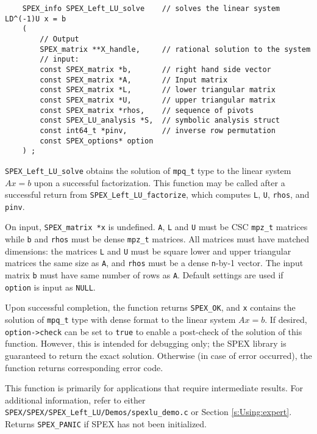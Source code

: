 \documentclass[12pt]{report}
\theoremstyle{definition}
\begin{document}
\begin{mdframed}[userdefinedwidth=6in]
{\footnotesize
\begin{verbatim}
    SPEX_info SPEX_Left_LU_solve    // solves the linear system LD^(-1)U x = b
    (
        // Output
        SPEX_matrix **X_handle,     // rational solution to the system
        // input:
        const SPEX_matrix *b,       // right hand side vector
        const SPEX_matrix *A,       // Input matrix
        const SPEX_matrix *L,       // lower triangular matrix
        const SPEX_matrix *U,       // upper triangular matrix
        const SPEX_matrix *rhos,    // sequence of pivots
        const SPEX_LU_analysis *S,  // symbolic analysis struct
        const int64_t *pinv,        // inverse row permutation
        const SPEX_options* option
    ) ;
\end{verbatim}
} \end{mdframed}

\verb|SPEX_Left_LU_solve| obtains the solution of \verb|mpq_t| type to the
linear system $Ax=b$ upon a successful factorization.  This function may be
called after a successful return from \verb|SPEX_Left_LU_factorize|, which
computes \verb|L|, \verb|U|, \verb|rhos|, and \verb|pinv|. 

On input, \verb|SPEX_matrix *x| is undefined. \verb|A|, \verb|L| and \verb|U|
must be CSC \verb|mpz_t| matrices while \verb|b| and \verb|rhos| must be dense
\verb|mpz_t|  matrices. All matrices must have matched dimensions: the matrices
\verb|L| and \verb|U| must be square lower and upper triangular matrices the
same size as \verb|A|, and \verb|rhos| must be a dense \verb|n|-by-1 vector.
The input matrix \verb|b| must have same number of rows as \verb|A|.  Default
settings are used if \verb|option| is input as \verb|NULL|.

Upon successful completion, the function returns \verb|SPEX_OK|, and \verb|x|
contains the solution of \verb|mpq_t| type with dense format to the linear
system $Ax=b$. If desired, \verb|option->check| can be set to \verb|true| to
enable a post-check of the solution of this function.  However, this is
intended for debugging only; the SPEX library is guaranteed to return the
exact solution. Otherwise (in case of error occurred), the function returns
corresponding error code.

This function is primarily for applications that require intermediate results.
For additional information, refer to either \verb|SPEX/SPEX/SPEX_Left_LU/Demos/spexlu_demo.c| or
Section \ref{s:Using:expert}.  Returns \verb|SPEX_PANIC| if SPEX has not
been initialized.
\end{document}
